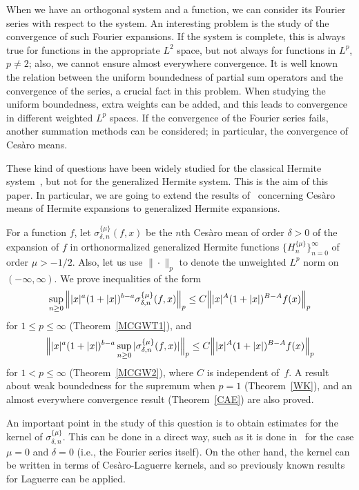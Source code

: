 \documentclass{amsart}
\theoremstyle{plain}
\theoremstyle{definition}
\theoremstyle{remark}
\newcommand{\chem}[3]{\sigma_{#1,#2}^{\{#3\}}} %
\newcommand{\herpol}[2]{H_{#1}^{\{#2\}}}
\newcommand{\I}{\infty}
\begin{document}
When we have an orthogonal system and a function, we can consider its Fourier series
with respect to the system. An interesting problem is the study of the convergence
of such Fourier expansions. If the system is complete, this is always true for
functions in the appropriate $L^2$ space, but not always for functions
in $L^p$, $p\ne2$; also, we cannot ensure almost everywhere convergence.
It is well known the relation between the uniform boundedness of partial sum operators and the
convergence of the series, a crucial fact in this problem. When studying the uniform
boundedness, extra weights can be added, and this leads to convergence in different weighted $L^p$
spaces. If the convergence of the Fourier series fails, another summation methods can be considered;
in particular, the convergence of Ces\`aro means.

These kind of questions have been widely studied for the classical
Hermite system~\cite{AW,M2,Po,MW2}, but not for the generalized Hermite system.
This is the aim of this paper. In particular, we are going to extend
the results of~\cite{MW2} concerning Ces\`aro means of Hermite expansions
to generalized Hermite expansions.

For a function $f$, let $\chem{\delta}{n}{\mu}(f,x)$ be the $n$th
Ces\`aro mean of order $\delta>0$ of the expansion of $f$ in orthonormalized
generalized Hermite functions $\{\herpol{n}{\mu}\}_{n=0}^\I$ of order $\mu>-1/2$.
Also, let us use $\|\cdot\|_p$ to denote the unweighted $L^p$ norm on $(-\I,\I)$.
We prove inequalities of the form
\begin{equation*}
  \sup_{n\ge0} \, \Bigl\| |x|^a(1+|x|)^{b-a}\chem{\delta}{n}{\mu}(f,x) \Bigr\|_p
  \le C \Bigl\| |x|^A(1+|x|)^{B-A}f(x) \Bigr\|_p
\end{equation*}
for $1 \le p \le \infty$ (Theorem~\ref{MCGWT1}), and
\begin{equation*}
  \Bigl\| |x|^a(1+|x|)^{b-a} \sup_{n\ge0} |\chem{\delta}{n}{\mu}(f,x)| \Bigr\|_p
  \le C \Bigl\||x|^A(1+|x|)^{B-A}f(x) \Bigr\|_p
\end{equation*}
for $1 < p \le \infty$ (Theorem~\ref{MCGW2}), where $C$ is independent of~$f$.
A result about weak boundedness for the supremum when $p=1$ (Theorem~\ref{WK}),
and an almost everywhere convergence result (Theorem~\ref{CAE}) are also proved.

An important point in the study of this question is to obtain
estimates for the kernel of $\chem{\delta}{n}{\mu}$.
This can be done in a direct way, such as it is done in~\cite{M}
for the case $\mu=0$ and $\delta=0$ (i.e., the Fourier series itself).
On the other hand, the kernel can be written in terms of Ces\`aro-Laguerre
kernels, and so previously known results for Laguerre can be applied.
\end{document}
